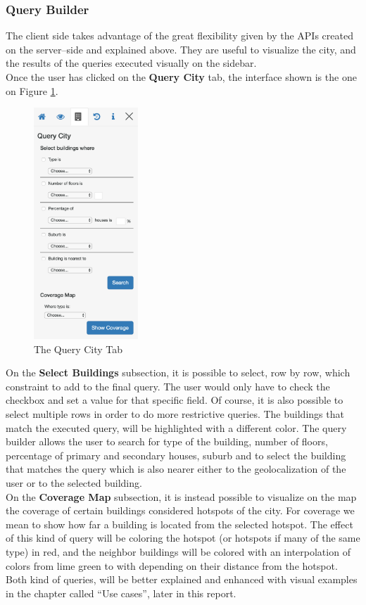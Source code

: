 \subsubsection{Query Builder}
The client side takes advantage of the great flexibility given by the APIs created on the server--side and explained above. They are useful to visualize the city, and the results of the queries executed visually on the sidebar.\\
Once the user has clicked on the {\bf Query City} tab, the interface shown is the one on Figure \ref{fig:query_city_tab}.\\ 
\begin{figure}[H]
\centering
\includegraphics[width=0.35\textwidth]{chapter3/images/query_city_tab}
\caption{The Query City Tab}
\label{fig:query_city_tab}
\end{figure}
On the {\bf Select Buildings} subsection, it is possible to select, row by row, which constraint to add to the final query. The user would only have to check the checkbox and set a value for that specific field. Of course, it is also possible to select multiple rows in order to do more restrictive queries. The buildings that match the executed query, will be highlighted with a different color. The query builder allows the user to search for type of the building, number of floors, percentage of primary and secondary houses, suburb and to select the building that matches the query which is also nearer either to the geolocalization of the user or to the selected building.\\

On the {\bf Coverage Map} subsection, it is instead possible to visualize on the map the coverage of certain buildings considered hotspots of the city. For coverage we mean to show how far a building is located from the selected hotspot. The effect of this kind of query will be coloring the hotspot (or hotspots if many of the same type) in red, and the neighbor buildings will be colored with an interpolation of colors from lime green to with depending on their distance from the hotspot.\\

Both kind of queries, will be better explained and enhanced with visual examples in the chapter called ``Use cases'', later in this report. 
